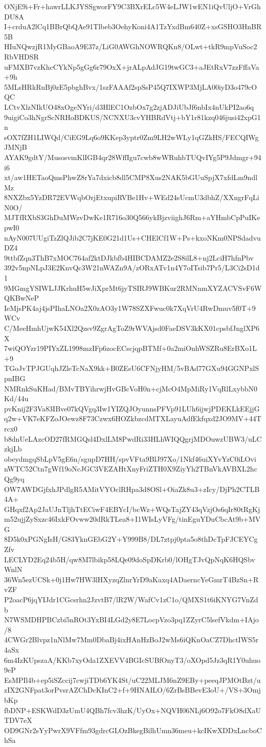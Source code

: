 ONjE9i+Fr+hawrLLKJYSSgworFY9C3BXrELc5W4eLJW1wEN1iQvUljO+VrGhDU8A
I+crduA2lCq1BBrQbQAe91Tlbeb3OehyKoni4A1TzYxdBm640Z+xsGSHO3HnBR5B
HIuNQwzjR1MyGBaoA9E37z/LiG0AWGhNOWRQKn8/OLwt+tkR9mpVuSoc2RbVHDSR
uFMXB7vzKhcCYkNp5gGg6r79OxX+jrALpAdJG19twGC3+aJEtRxV7zzFffaVa+9h
5MLsHRkRuBj0zE5pbghBvx/1szFAAAf2spSsP45Q7IXWP3MjLA00iyD3o479cOQC
LCtvXlzNIkUO48xOgeNYri/d3HlEC1OzbOx7g2zjADJiUbJf6nbIx4nUkPI2ao6q
9uigiCo3hNgrScNRHoBDKUS/NCNXU3cvYHBRdVtj+bY1r81kzq046jusi42xpG1n
sOX7fZH1LIWQd/CiEG9Lq6o9KKep3yptr0Zm9LH2wWLy1qGZkHS/FECQIWgJMNjB
AYAK9gdtY/MusosvmKlIGB4qr28WffIgu7cwb8wWRuhbTUQvIYg5P9Jdmgr+94i6
xt/aw1HETaoQmsPhwZ8rYa7dxicb8dl5CMP8Xus2NAK5bGUuSpjX7xfdLm9ndlMz
8NXZbx5YzDR72EVWqbOrjEtxupiRVBe1Hv+WEd24sUcmU3dbhZ/XXngrFqLiN0O/
MJTfRXbS3GhDuMWzvDwKe1R716o30Q566ykBjzviighJ6Rm+aYHmbCpPuIKepwI0
nAyN007UUgiTzZlQJib2C7jKE0G21d1Us+CHElCf1W+Ps+kxoNKm0NPSdadvuDZ4
9ttbfZqn3ThB7xMOC764af2ktDJkbfb4HIBCDAMZ2e2S8ilL8+nj2LciH7hfnPbv
392v5npNLpJ3E2KnvQc3W21nWAZn9A/zORxATv1n4Y7oITsib7Pr5/L3Ci2sD1d1
9MGmgYSIWLJJKrhuH5wJiXprMt6jyTSIRJ9WBKur2RMNnmXYZACVSvF6WQKBwNeP
IeMjsPK4aj4jsPIhaLNOa2X0zAO3y1W78SZXFwuc0k7XqVrU4RwDmuv5f0T+9WCv
C/MeeHmhUjwK54Xl2Qzsv9ZgrAgToZ9rWVAjsd0FaeDSV3kKX01cpsbfJnglXP6X
7wiQOYzr19PIYxZL1998mzIFp6zocECscjqpBTMf+0a2miOnhWSZRu8ErBXo1L+9
TGoJvTPJGUqhJZleTcNaX9kk+B0ZEsU6CFNjyHM/5vBAd77GXu94GGNPxlSpnIBG
NMRnkSuKHad/BMvTBYihrwjHvGBcVoH0n+cjMcO4MpMiRy1VqRlLxybbN0Kd/44u
pvKnij2F3Va83IBve07kQVgq3Iw1YIZQJOyunnsPFVp91LUh6ijwjPDEKLkEEjjG
q2w+VK7eKFZoJOewz8F73Czwx6HOZkbzcdMTXLayuAdfEkfqxd2JO9MV+44Trcx0
b8dnUeLAzcOD27fRMGQsl4DxlLM8PwdRi33HLhWIQQgrjMDOuwzUBW3/uLCzkjLb
obeydmgqSbLpV5gE6n/sgupD7HH/spvVFta9BlJ97Xo/1Nkf46uiXYvYzC0iLOvi
nWTC52Ctn7gWf19oNcJGC3VEZAHtXnyFriZTH0X9ZiyYh2TBnVkAVBXL2hcQg9yq
OW7AWDGjfxhJPdlgR5AMitVYOclRHpa3d8OSl+OiaZk8u3+zIcy/DjPh2CTLB4A+
GHqxf2Ap2JaUJnTljhTtECiwF4EBYcI/bcWz+WQsTajZY43qVzjOs6qIr80tRgKj
m52ujjZySxzc46IxkFOvww20dRkTLea8+I1WIsLyVFg/tinEguYDuCbcAt9b+MVG
8D5k0xPGNgIsH/G83YknGEbG2Y+Y999B8/DL7ztpj0pta5o8thDcTpFJCEYCgZfv
LECLYD2Eq24b5H/qw8M7lbikp58LQe09doSpDKrb0/lOHgTJvQpNqK6HQSbvWnlN
36Wn5ezUCSk+0j1Hw7HW3lHXyzqZlnrYrD9aKaxq4ADaerncYeGmrT4BzSn+RvZF
P2oacP6jqYIJdr1CGcsrhn2JzvtB7/lR2W/WafCv1zC1o/QMXS1t6iKNYG7VnZdb
N7WSMDHPBCzbi5nROt3YxBI4LGd2y8E7LocpVzo3pq1ZZyrC5lsefVkdm+IAjo/8
4CWGr2Blvpz1nNlMw7Mm0DbaBj4ixHAnHzBoJ2wMs6iQKnOaCZ7DhctIWS5r4aSx
6m4IzKUpszaA/KKb7xyOda1ZXEVV4BGIcSUBfOnyT3/oXOpd5Jz3qR1Y0uhuo9eP
EsMPIl4b+ep5iSZccij7cwjiTDb6YK4St/uC22MLJM6nZ9EBy+peeqJPMOtBzt/u
zIX2GNFpat3orPvsrAZChDcKInC2+f+9HNAILO/6ZrBsBBevE3oU+/VS+3OmjbKp
fbDNP+ESKWdD3zUmU4QBh7fcv3hzK/UyOx+NQVH06NLj6O92o7FkO8dXaUTDV7eX
OD9GNr2sYyPwrX9VFfm93gdrcGLOzBkegBilhUmn36meu+kcIKwXDDxLncboChSa
